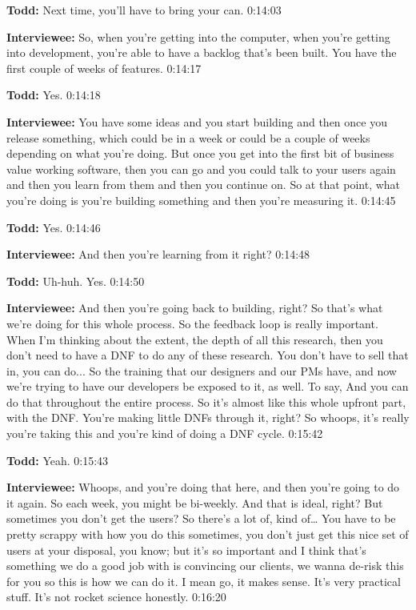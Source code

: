 \textbf{Todd:} Next time, you'll have to bring your can.  0:14:03

\textbf{Interviewee:} So, when you're getting into the computer, when you're getting into development, you're able to have a backlog that's been built.  You have the first couple of weeks of features.   0:14:17

\textbf{Todd:} Yes.  0:14:18

\textbf{Interviewee:} You have some ideas and you start building and then once you release something, which could be in a week or could be a couple of weeks depending on what you're doing.  But once you get into the first bit of business value working software, then you can go and you could talk to your users again and then you learn from them and then you continue on.  So at that point, what you're doing is you're building something and then you're measuring it.    0:14:45

\textbf{Todd:} Yes.   0:14:46

\textbf{Interviewee:} And then you're learning from it right?   0:14:48

\textbf{Todd:} Uh-huh. Yes.  0:14:50

\textbf{Interviewee:} And then you're going back to building, right? So that's what we're doing for this whole process. So the feedback loop is really important. When I'm thinking about the extent, the depth of all this research, then you don't need to have a DNF to do any of these research.  You don't have to sell that in, you can do...  So the training that our designers and our PMs have, and now we're trying to have our developers be exposed to it, as well.  To say,   And you can do that throughout the entire process.  So it's almost like this whole upfront part, with the DNF.  You're making little DNFs through it, right?  So whoops, it's really you're taking this and you're kind of doing a DNF cycle.   0:15:42

\textbf{Todd:} Yeah.   0:15:43

\textbf{Interviewee:} Whoops, and you're doing that here, and then you're going to do it again. So each week, you might be bi-weekly.   And that is ideal, right?  But sometimes you don't get the users?  So there's a lot of, kind of…  You have to be pretty scrappy with how you do this sometimes, you don't just get this nice set of users at your disposal, you know; but it's so important and I think that's something we do a good job with is convincing our clients, we wanna de-risk this for you so this is how we can do it.  I mean go, it makes sense.  It's very practical stuff.  It's not rocket science honestly.   0:16:20
